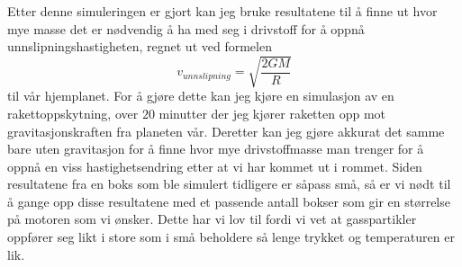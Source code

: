 \documentclass[11pt, A4paper, norsk]{report}
\begin{document}
Etter denne simuleringen er gjort kan jeg bruke resultatene til å finne ut hvor mye masse det er nødvendig å ha med seg i drivstoff for å oppnå unnslipningshastigheten, regnet ut ved formelen $$v_{unnslipning} = \sqrt{\frac{2GM}{R}}$$ \cite{Sciencetopia} til vår hjemplanet. For å gjøre dette kan jeg kjøre en simulasjon av en rakettoppskytning, over $20$ minutter der jeg kjører raketten opp mot gravitasjonskraften fra planeten vår. Deretter kan jeg gjøre akkurat det samme bare uten gravitasjon for å finne hvor mye drivstoffmasse man trenger for å oppnå en viss hastighetsendring etter at vi har kommet ut i rommet. Siden resultatene fra en boks som ble simulert tidligere er såpass små, så er vi nødt til å gange opp disse resultatene med et passende antall bokser som gir en størrelse på motoren som vi ønsker. Dette har vi lov til fordi vi vet at gasspartikler oppfører seg likt i store som i små beholdere så lenge trykket og temperaturen er lik.
\end{document}
